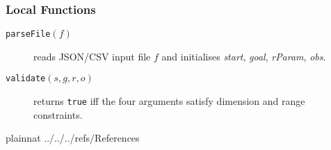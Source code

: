 \documentclass[12pt, titlepage]{article}
\begin{document}
\subsubsection{Local Functions}
\begin{description}
  \item[\texttt{parseFile}$(f)$] reads JSON/CSV input file $f$ and initialises
        \textit{start}, \textit{goal}, \textit{rParam}, \textit{obs}.
  \item[\texttt{validate}$(s, g, r, o)$] returns \texttt{true} iff the four
        arguments satisfy dimension and range constraints.
\end{description}

\newpage



 {plainnat}
 {../../../refs/References}








% 

\end{document}

